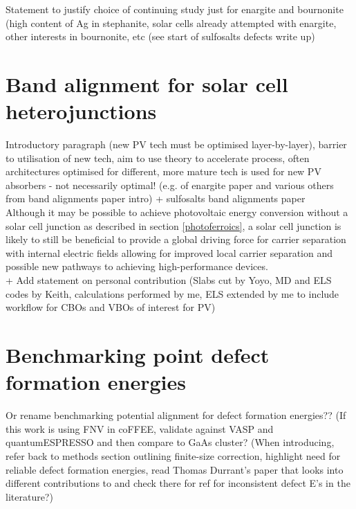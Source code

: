 \documentclass[11pt, twoside]{report}
\begin{document}
Statement to justify choice of continuing study just for enargite and bournonite (high content of Ag in stephanite, solar cells already attempted with enargite, other interests in bournonite, etc (see start of sulfosalts defects write up)

\section{Band alignment for solar cell heterojunctions}\label{sulfosalt_band_alignment}
Introductory paragraph (new PV tech must be optimised layer-by-layer), barrier to utilisation of new tech, aim to use theory to accelerate process, often architectures optimised for different, more mature tech is used for new PV absorbers - not necessarily optimal! (e.g. of enargite paper and various others from band alignments paper intro) + sulfosalts band alignments paper\\

Although it may be possible to achieve photovoltaic energy conversion without a solar cell junction as described in section \ref{photoferroics}, a solar cell junction is likely to still be beneficial to provide a global driving force for carrier separation with internal electric fields allowing for improved local carrier separation and possible new pathways to achieving high-performance devices.\\

+ Add statement on personal contribution (Slabs cut by Yoyo, MD and ELS codes by Keith, calculations performed by me, ELS extended by me to include workflow for CBOs and VBOs of interest for PV)



\section{Benchmarking point defect formation energies}\label{defect_benchmark}

Or rename benchmarking potential alignment for defect formation energies?? (If this work is using FNV in coFFEE, validate against VASP and quantumESPRESSO and then compare to GaAs cluster? (When introducing, refer back to methods section outlining finite-size correction, highlight need for reliable defect formation energies, read Thomas Durrant's paper that looks into different contributions to and check there for ref for inconsistent defect E's in the literature?)\\
\end{document}
